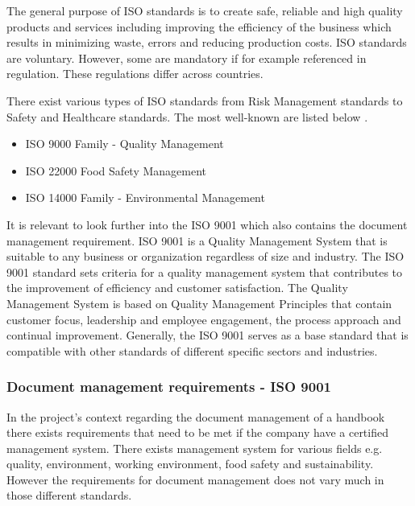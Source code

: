 The general purpose of ISO standards is to create safe, reliable and high quality products and services including improving the efficiency of the business which results in minimizing waste, errors and reducing production costs\cite{ISOinfo}. %
ISO standards are voluntary. However, some are mandatory if for example referenced in regulation. These regulations differ across countries\cite{ISOreviewedevery5years}.

There exist various types of ISO standards from Risk Management standards to Safety and Healthcare standards. The most well-known are listed below \citep{ISOmostpopularlist}.

\begin{itemize}
	\item ISO 9000 Family - Quality Management
	\item ISO 22000 Food Safety Management
	\item ISO 14000 Family - Environmental Management
\end{itemize}

It is relevant to look further into the ISO 9001 which also contains the document management requirement. ISO 9001 is a Quality Management System that is suitable to any business or organization regardless of size and industry\cite{ISO9001}. The ISO 9001 standard sets criteria for a quality management system that contributes to the improvement of efficiency and customer satisfaction. The Quality Management System is based on Quality Management Principles that contain customer focus, leadership and employee engagement, the process approach and continual improvement\cite{ISO9001-2}. Generally, the ISO 9001 serves as a base standard that is compatible with other standards of different specific sectors and industries.

\subsubsection{Document management requirements - ISO 9001}
In the project's context regarding the document management of a handbook there exists requirements that need to be met if the company have a certified management system. There exists management system for various fields e.g. quality, environment, working environment, food safety and sustainability.  However the requirements for document management does not vary much in those different standards.

